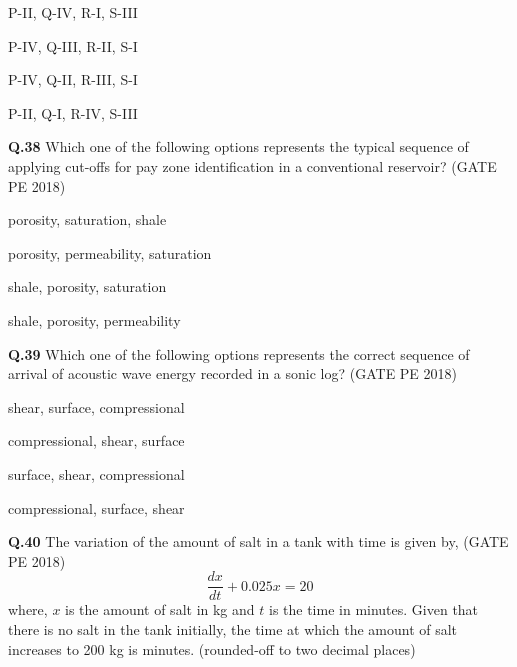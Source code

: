 \documentclass[journal,12pt,onecolumn]{IEEEtran}
\theoremstyle{remark}
\begin{document}
\begin{enumerate} 
\begin{multicols}{2}
\item P-II, Q-IV, R-I, S-III \item P-IV, Q-III, R-II, S-I \\
\item P-IV, Q-II, R-III, S-I \item P-II, Q-I, R-IV, S-III \\
\end{multicols}
\end{enumerate}



\noindent\textbf{Q.38} Which one of the following options represents the typical sequence of applying cut-offs for pay zone identification in a conventional reservoir? \hfill (GATE PE 2018)


\begin{enumerate} 
\begin{multicols}{2}
\item porosity, saturation, shale \item porosity, permeability, saturation \\
\item shale, porosity, saturation \item shale, porosity, permeability \\
\end{multicols}
\end{enumerate}


\noindent\textbf{Q.39} Which one of the following options represents the correct sequence of arrival of acoustic wave energy recorded in a sonic log? \hfill (GATE PE 2018)


\begin{enumerate} 
\begin{multicols}{2}
\item shear, surface, compressional  \item compressional, shear, surface \\ 
\item surface, shear, compressional  \item compressional, surface, shear \\
\end{multicols}
\end{enumerate}



\noindent\textbf{Q.40} The variation of the amount of salt in a tank with time is given by, \hfill (GATE PE 2018)
\[ \frac{dx}{dt} + 0.025x = 20 \]
where, $x$ is the amount of salt in kg and $t$ is the time in minutes. Given that there is no salt in the tank initially, the time at which the amount of salt increases to 200 kg is \underline{\hspace{2cm}} minutes. (rounded-off to two decimal places)
\end{document}
